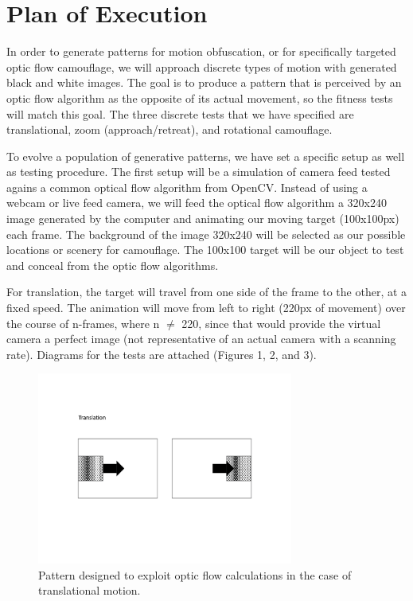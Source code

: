 \documentclass[12pt,letter]{article}
\begin{document}
\section{Plan of Execution}

 In order to generate patterns for motion obfuscation, or for specifically targeted optic flow camouflage, we will approach discrete types of motion with generated black and white images. The goal is to produce a pattern that is perceived by an optic flow algorithm as the opposite of its actual movement, so the fitness tests will match this goal. The three discrete tests that we have specified are translational, zoom (approach/retreat), and rotational camouflage. 

To evolve a population of generative patterns, we have set a specific setup as well as testing procedure. The first setup will be a simulation of camera feed tested agains a common optical flow algorithm from OpenCV. Instead of using a webcam or live feed camera, we will feed the optical flow algorithm a 320x240 image generated by the computer and animating our moving target (100x100px) each frame. The background of the image 320x240 will be selected as our possible locations or scenery for camouflage. The 100x100 target will be our object to test and conceal from the optic flow algorithms. 

For translation, the target will travel from one side of the frame to the other, at a fixed speed. The animation will move from left to right (220px of movement) over the course of n-frames, where n $\not=$ 220, since that would provide the virtual camera a perfect image (not representative of an actual camera with a scanning rate). Diagrams for the tests are attached (Figures 1, 2, and 3).

\begin{figure}[H]
    \centering
    \includegraphics[width=0.75\textwidth]{opticflow_diagrams-01.png}
    \caption{Pattern designed to exploit optic flow calculations in the case of translational motion.}
    \label{fig:lieflat}
\end{figure}
\end{document}
